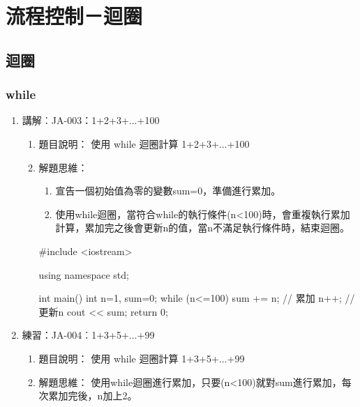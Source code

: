 
\section{流程控制－迴圈}

\subsection{迴圈}
\subsubsection {while}
\begin{enumerate}
	\item 講解︰JA-003：1+2+3+...+100
		\begin{enumerate}
			\item 題目說明：
			\subitem 使用 while 迴圈計算 1+2+3+...+100
			
			\item 解題思維：
			\begin{enumerate}
				\item 宣告一個初始值為零的變數sum=0，準備進行累加。
				\item 使用while迴圈，當符合while的執行條件(n<100)時，會重複執行累加計算，累加完之後會更新n的值，當n不滿足執行條件時，結束迴圈。
				
			\end{enumerate}
				\begin{cppcode}
				#include <iostream>
				
				using namespace std;
				
				int main()
				{
					int n=1, sum=0;
					while (n<=100) {
						sum += n; // 累加
						n++; // 更新n
					}
					cout << sum;
					return 0;
				}
				
			\end{cppcode}
		\end{enumerate}
		
	\item 練習：JA-004︰1+3+5+...+99
		\begin{enumerate}
			\item 題目說明：
			\subitem 使用 while 迴圈計算 1+3+5+...+99
			
			\item 解題思維：
			\subitem 使用while迴圈進行累加，只要(n<100)就對sum進行累加，每次累加完後，n加上2。

		\end{enumerate}
	
\end{enumerate}


